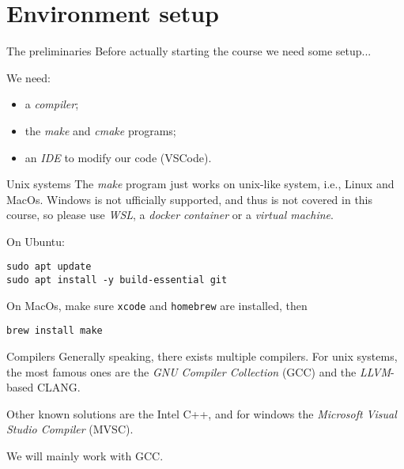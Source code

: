 \section{Environment setup}
\begin{frame}{The preliminaries}
    Before actually starting the course we need some setup...

    We need:
    \begin{itemize}
        \item a \emph{compiler}; 
        \item the \emph{make} and \emph{cmake} programs;
        \item an \emph{IDE} to modify our code (VSCode).
    \end{itemize}
    
\end{frame}


\begin{frame}[fragile]{Unix systems}
    The \emph{make} program just works on unix-like system, i.e., Linux and MacOs. 
    Windows is not ufficially supported, and thus is not covered in this course, so please use \textit{WSL}, a \textit{docker container} or a \textit{virtual machine}.

    On Ubuntu:
\begin{lstlisting}
sudo apt update
sudo apt install -y build-essential git \end{lstlisting}

    On MacOs, make sure \texttt{xcode} and \texttt{homebrew} are installed, then
\begin{lstlisting}
brew install make\end{lstlisting}

    
    
\end{frame}

\begin{frame}{Compilers}
    Generally speaking, there exists multiple compilers. For unix systems, the most famous ones are the \emph{GNU Compiler Collection} (GCC) and the \emph{LLVM}-based {CLANG}.

    Other known solutions are the Intel C++, and for windows the \emph{Microsoft Visual Studio Compiler} (MVSC).

    We will mainly work with GCC.
\end{frame}


